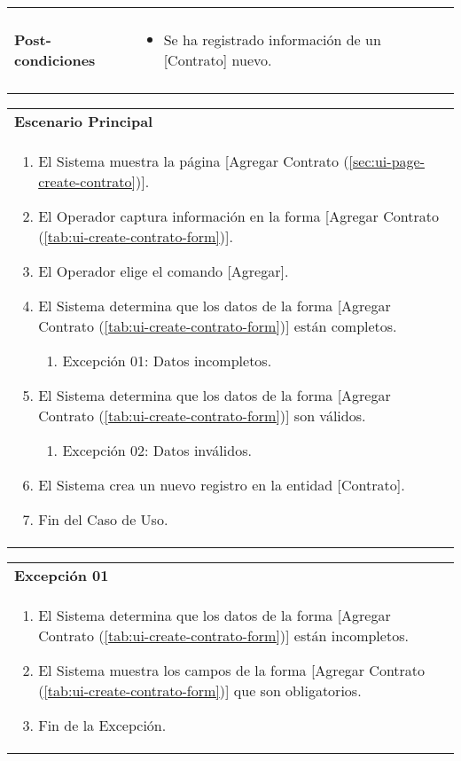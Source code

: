 \begin{tabular}{ p{3.5cm} p{11.5cm} }
\begin{minipage}[t]{0.6\textwidth}
\begin{itemize}
			\end{itemize}
			\end{minipage} \\
		\textbf{Post-condiciones} &
			\begin{minipage}[t]{0.6\textwidth}
			\begin{itemize}[noitemsep,nolistsep]
			\setlength{\itemindent}{-.5cm}
				\item Se ha registrado informaci\'on de un [Contrato] nuevo.
			\end{itemize}
			\end{minipage} \\
		\\
	\end{tabular}
	
	\begin{tabular}{ p{15.5cm} }
		\textbf{Escenario Principal} \\
		\begin{enumerate}
			\item El Sistema muestra la p\'agina [Agregar Contrato (\ref{sec:ui-page-create-contrato})].
			\item El Operador captura informaci\'on en la forma [Agregar Contrato (\ref{tab:ui-create-contrato-form})].
			\item El Operador elige el comando [Agregar].
			\item El Sistema determina que los datos de la forma [Agregar Contrato (\ref{tab:ui-create-contrato-form})] est\'an completos.
				\begin{enumerate}
					\item Excepci\'on 01: Datos incompletos.
				\end{enumerate}
			\item El Sistema determina que los datos de la forma [Agregar Contrato (\ref{tab:ui-create-contrato-form})] son v\'alidos.
				\begin{enumerate}
					\item Excepci\'on 02: Datos inv\'alidos.
				\end{enumerate}
			\item El Sistema crea un nuevo registro en la entidad [Contrato].
			\item Fin del Caso de Uso.
		\end{enumerate}
	\end{tabular}
	
	\begin{tabular}{ p{15.5cm} }
		\textbf{Excepci\'on 01} \\
		\begin{enumerate}
			\item El Sistema determina que los datos de la forma [Agregar Contrato (\ref{tab:ui-create-contrato-form})] est\'an incompletos.
			\item El Sistema muestra los campos de la forma [Agregar Contrato (\ref{tab:ui-create-contrato-form})] que son obligatorios.
			\item Fin de la Excepci\'on.
		\end{enumerate}
	\end{tabular}
	
